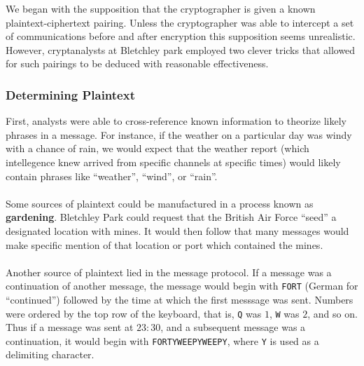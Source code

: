We began with the supposition that the
cryptographer is given a known plaintext-ciphertext pairing. Unless
the cryptographer was able to intercept
a set of communications before and after encryption this supposition
seems unrealistic. However, cryptanalysts at Bletchley park
employed two clever tricks that allowed for such pairings to be
deduced with reasonable effectiveness.
\subsubsection{Determining Plaintext}
First, analysts were able to cross-reference known information to
theorize likely phrases in a
message. For instance, if the weather on a particular day was windy
with a chance of rain, we would expect that the weather report (which
intellegence knew arrived from specific channels at specific times)
would likely contain phrases like ``weather'', ``wind'', or ``rain''.
\\\\Some sources of plaintext could be manufactured in a process
known as {\bf{gardening}}. Bletchley Park could request that the
British Air Force ``seed'' a designated location with mines. It would
then follow that many messages would make specific mention of that
location or port which contained the mines.
\\\\Another source of plaintext lied in the message protocol. If a
message was a continuation of another message, the message would
begin with \texttt{FORT} (German for ``continued'') followed by the
time at which the first messsage was sent. Numbers were ordered by
the top row of the keyboard, that is, \texttt{Q} was $1$, \texttt{W}
was $2$, and so on.  Thus if a message was sent at $23:30$, and a
subsequent message was a continuation, it would begin with
\texttt{FORTYWEEPYWEEPY}, where \texttt{Y} is used as a delimiting character.
